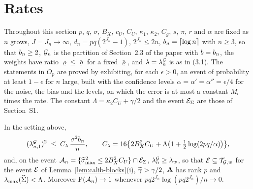 \section{Rates}
\setcounter{equation}{0}



Throughout this section $p$, $q$, $\sigma$, $B_X$, $c_U$, $C_U$, $\kappa_1$,
$\kappa_2$, $C_g$, $s$, $\pi$, $r$ and $\alpha$ are fixed as $n$ grows,
$J = J_n \to \infty$, $d_n = pq(2^{J_n}-1)$,
$2^{J_n} \le 2n$,
$b_{n} = \lceil\log n\rceil$ with $n \ge 3$, so that $b_{n} \ge 2$, $\mathcal{G}_{n}$ is
the partition of Section~2.3 of the paper with $b = b_{n}$, the weights have
ratio $\varrho \le \bar\varrho$ for a fixed $\bar\varrho$, and $\lambda = \lambda^{\mathcal{G}}_{n}$
is as in (3.1).  The statements in $O_p$
are proved by exhibiting, for each $\epsilon > 0$, an event of probability at
least $1-\epsilon$ for $n$ large, built with the confidence levels
$\alpha = \alpha' = \alpha'' = \epsilon/4$ for the noise, the bias and the
levels, on which the error is at most a constant $M_\epsilon$ times the rate.
The constant $\Lambda = \kappa_2C_U + \gamma/2$ and the event $\mathcal{E}_{\Sigma}$ are those
of Section~S1.


\begin{lemma}
\label{lem:regime}
In the setting above,
\begin{equation}
  \label{eq:order-lambda}
  (\lambda^{\mathcal{G}}_{n,1})^{2} \;\le\; C_{\lambda}\,\frac{\sigma^{2}b_{n}}{n},
  \qquad
  C_{\lambda} = 16\bigl\{2B_X^{2}C_U + \Lambda\bigl(1 + \tfrac12\log(2pq/\alpha)\bigr)\bigr\},
\end{equation}
and, on the event $\mathcal{A}_{n} = \{\widehat{\sigma}_{\max}^{2} \le 2B_X^{2}C_U\}\cap\mathcal{E}_{\Sigma}$,
$\lambda^{\mathcal{G}}_{n} \ge \lambda_{w}$, so that $\mathcal{E} \subseteq \mathcal{T}_{\mathcal{G},w}$ for the event $\mathcal{E}$ of
Lemma~\ref{lem:calib-blocks}(i), $\widetilde{\gamma} > \gamma/2$, $\mathbf{A}$ has rank $p$ and
$\lambda_{\max}(\widehat{\Sigma}) < \Lambda$. Moreover $\mathrm{P}(\mathcal{A}_{n}) \to 1$ whenever
$pq2^{J_n}\log(pq2^{J_n})/n \to 0$.
\end{lemma}

